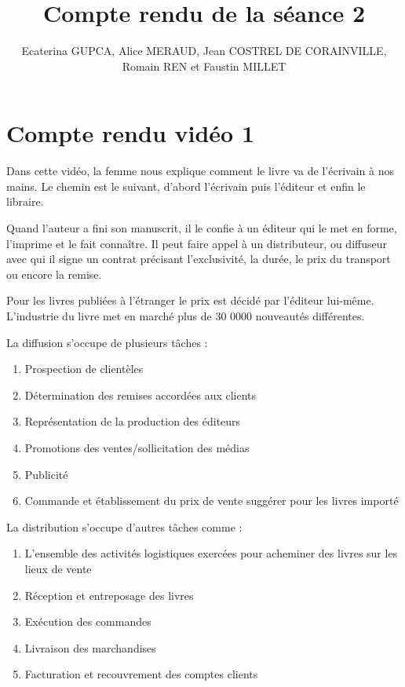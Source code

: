 \documentclass[a4paper, 13pt]{article}
\begin{document}
\title{Compte rendu de la séance 2}
\author{Ecaterina GUPCA, Alice MERAUD, Jean COSTREL DE CORAINVILLE, Romain REN et Faustin MILLET}
\maketitle

\section{Compte rendu vidéo 1}
Dans cette vidéo, la femme nous explique comment le livre va de l’écrivain à nos mains. Le chemin est le suivant, d'abord l'écrivain puis l'éditeur et enfin le libraire.

Quand l'auteur a fini son manuscrit, il le confie à un éditeur qui le met en forme, l'imprime et le fait connaître. Il peut faire appel à un distributeur, ou diffuseur avec qui il signe un contrat précisant l'exclusivité, la durée, le prix du transport ou encore la remise.

Pour les livres publiées à l'étranger le prix est décidé par l’éditeur lui-même. L'industrie du livre met en marché plus de 30 0000 nouveautés différentes. 

La diffusion s'occupe de plusieurs tâches :
\begin{enumerate}
    \item Prospection de clientèles
    \item Détermination des remises accordées aux clients
    \item Représentation de la production des éditeurs
    \item Promotions des ventes/sollicitation des médias
    \item Publicité
    \item Commande et établissement du prix de vente suggérer pour les livres importé
\end{enumerate}

La distribution s'occupe d'autres tâches comme :
\begin{enumerate}
    \item L'ensemble des activités logistiques exercées pour acheminer des livres sur les lieux de vente
    \item Réception et entreposage des livres
    \item Exécution des commandes
    \item Livraison des marchandises
    \item Facturation et recouvrement des comptes clients
\end{enumerate}
\end{document}
